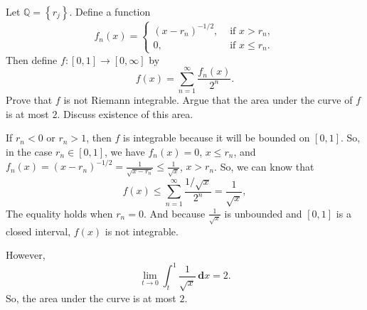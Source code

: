 \documentclass[en, normal, 11pt, black]{elegantnote}
\newenvironment{exercise}[1]{\begin{tcolorbox}[colback=black!15, colframe=black!80, breakable, title=#1]}{\end{tcolorbox}}
\renewenvironment{proof}{\begin{tcolorbox}[colback=white, colframe=black!50, breakable, title=Proof. ]\setlength{\parskip}{0.8em}}{\,\\\rightline{$\square$}\end{tcolorbox}}
\newcommand{\der}{\,\mathbf{d}}
\begin{document}
\begin{exercise}{(3), }
    Let $\mathbb{Q}=\left\{r_{j}\right\} .$ Define a function 
    \[
        f_{n}(x)= \begin{cases}\left(x-r_{n}\right)^{-1 / 2}, & \text { if } x>r_{n}, \\ 0, & \text { if } x \leq r_{n}. \end{cases}
    \]
    Then define $f:[0,1] \rightarrow[0, \infty]$ by
    \[
        f(x)=\sum_{n=1}^{\infty} \frac{f_{n}(x)}{2^{n}}. 
    \]
    Prove that $f$ is not Riemann integrable. Argue that the area under the curve of $f$ is at most $2 .$ Discuss existence of this area.
\end{exercise}

\begin{proof}

    If $r_n<0$ or $r_n>1$, then $f$ is integrable because it will be bounded on $[0,1]$. So, in the case $r_n\in[0,1]$, we have $f_n(x)=0$, $x\leqslant r_n$, and $f_n(x)=(x-r_n)^{-1/2}=\frac{1}{\sqrt{x-r_n}}\leqslant\frac{1}{\sqrt{x}}$, $x>r_n$. So, we can know that 
    \[
        f(x)\leqslant\sum_{n=1}^{\infty} \frac{1/\sqrt{x}}{2^{n}}=\frac{1}{\sqrt{x}}, 
    \]
    The equality holds when $r_n=0$. And because $\frac{1}{\sqrt{x}}$ is unbounded and $[0,1]$ is a closed interval, $f(x)$ is not integrable. 

    However, 
    \[
        \lim_{t\to0}\int_t^1\frac{1}{\sqrt{x}}\der x=2. 
    \]
    So, the area under the curve is at most $2$. \vspace{-10pt}
\end{proof}
\end{document}

